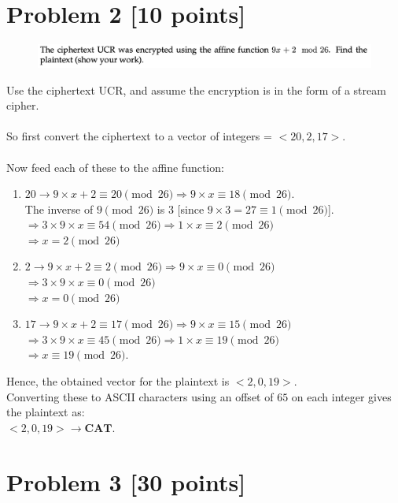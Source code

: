 \documentclass{ashoka-crypto}
\begin{document}
\section*{Problem 2 [10 points]}

\begin{figure}[h]
\includegraphics[width=17cm]{2}
\end{figure}

Use the ciphertext UCR, and assume the encryption is in the form of a stream cipher.\\\\
So first convert the ciphertext to a vector of integers = $<20, 2, 17>$.\\\\
Now feed each of these to the affine function:
\begin{enumerate}
\item $20 \rightarrow 9\times x + 2 \equiv 20 \pmod {26} \Rightarrow 9\times x \equiv 18 \pmod {26}$.\\
The inverse of $9 \pmod {26}$ is 3 [since $9\times 3 = 27 \equiv 1 \pmod {26}$].\\
$\Rightarrow 3\times 9 \times x \equiv 54 \pmod {26} \Rightarrow 1 \times x \equiv 2 \pmod {26}$\\
$\Rightarrow x = 2 \pmod {26}$
\item $2 \rightarrow 9 \times x + 2 \equiv 2 \pmod {26} \Rightarrow 9 \times x \equiv 0 \pmod {26}$\\
$\Rightarrow 3\times 9 \times x \equiv 0 \pmod {26}$\\
$\Rightarrow x = 0 \pmod {26}$
\item $17 \rightarrow 9 \times x + 2 \equiv 17 \pmod {26} \Rightarrow 9 \times x \equiv 15 \pmod {26}$\\
$\Rightarrow 3\times 9 \times x \equiv 45 \pmod {26} \Rightarrow 1 \times x \equiv 19 \pmod {26}$\\
$\Rightarrow x \equiv 19 \pmod {26}$.
\end{enumerate}

Hence, the obtained vector for the plaintext is $<2,0,19>$.\\
Converting these to ASCII characters using an offset of $65$ on each integer gives the plaintext as:\\
$<2,0,19> \rightarrow \textbf{CAT}$. 

\section*{Problem 3 [30 points]}
\end{document}
